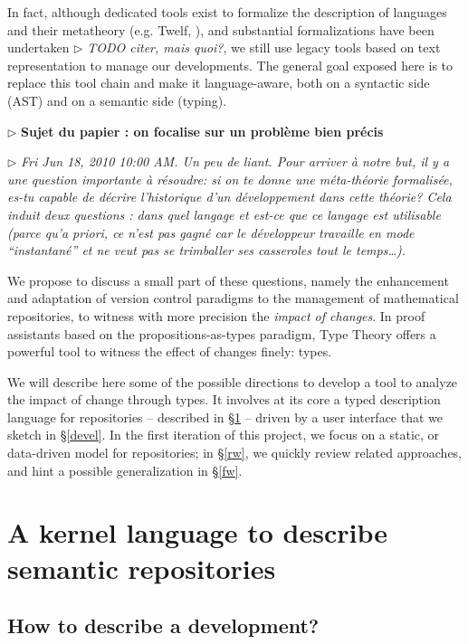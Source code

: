 \documentclass{article}
\newcommand{\remplan}[1]{\noindent\textcolor{bwblue}{$\triangleright$ \textbf{#1}}}
\newcommand{\remtext}[1]{\textcolor{bwgreen}{$\triangleright$ \textsl{#1}}}
\begin{document}
In fact, although dedicated tools exist to formalize the description
of languages and their metatheory (e.g. \textsf{Twelf},
{\cite{pfenning1999system}}), and substantial formalizations have been
undertaken \remtext{TODO citer, mais quoi?}, we still use legacy tools
based on text representation to manage our developments. The general
goal exposed here is to replace this tool chain and make it
language-aware, both on a syntactic side (AST) and on a semantic side
(typing).

\remplan{Sujet du papier : on focalise sur un problème bien précis}

\remtext{Fri Jun 18, 2010 10:00 AM.
  Un peu de liant. Pour arriver à notre but, il y a une
  question importante à résoudre: si on te donne une méta-théorie
  formalisée, es-tu capable de décrire l'historique d'un développement
  dans cette théorie? Cela induit deux questions : dans quel langage
  et est-ce que ce langage est utilisable (parce qu'a priori, ce n'est
  pas gagné car le développeur travaille en mode ``instantané'' et ne
  veut pas se trimballer ses casseroles tout le temps\ldots).}

We propose to discuss a small part of these questions, namely the
enhancement and adaptation of version control paradigms to the
management of mathematical repositories, to witness with more
precision the \emph{impact of changes}. In proof assistants based on the
propositions-as-types paradigm, Type Theory offers a powerful tool to
witness the effect of changes finely: types. 

We will describe here some of the possible directions to develop a
tool to analyze the impact of change through types. It involves at its
core a typed description language for repositories -- described in
\S\ref{kernel} -- driven by a user interface that we sketch in
\S\ref{devel}. In the first iteration of this project, we focus on a
static, or data-driven model for repositories; in \S\ref{rw}, we
quickly review related approaches, and hint a possible generalization
in \S\ref{fw}.

\section{A kernel language to describe semantic repositories}
\label{kernel}

\subsection{How to describe a development?}
\end{document}
